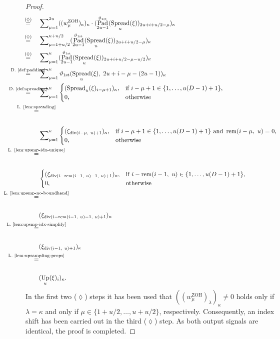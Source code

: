 \documentclass[journal]{IEEEtran}
\newcommand{\discint}[2]{\{#1,\dotsc,#2\}}
\newcommand{\inint}[2]{\in\discint{#1}{#2}}
\renewcommand{\div}[2]{\operatorname{div}(#1,\ #2)}
\newcommand{\rem}[2]{\operatorname{rem}(#1,\ #2)}
\newcommand{\equsing}[1]{\overset{\mathclap{\text{#1}}}{=}}
\DeclareMathOperator{\Upsampling}{Up}
\DeclareMathOperator{\Padding}{Pad}
\DeclareMathOperator{\Spreading}{Spread}
\DeclareMathOperator{\ZOH}{ZOH}
\newcommand{\Dirichlet}{1\text{st}}
\begin{document}
\begin{proof}
\begin{align*}
  \equsing{($\lozenge$)}\ \ \ \ & \sum\nolimits_{\mu = 1}^{2u} ((w^{\ZOH}_\mu)_\kappa)_\kappa \cdot (\Padding_{2u - 1}^{\vartheta_{\Dirichlet}}( \Spreading_u(\xi))_{2u + i + u/2 - \mu})_\kappa\\
  \equsing{($\lozenge$)}\ \ \ \ & \sum\nolimits_{\mu = 1 + u/2}^{u + u/2} (\Padding_{2u - 1}^{\vartheta_{\Dirichlet}}( \Spreading_u(\xi))_{2u + i + u/2 - \mu})_\kappa\\
  \equsing{($\lozenge$)}\ \ \ \ & \sum\nolimits_{\mu = 1}^{u} (\Padding_{2u - 1}^{\vartheta_{\Dirichlet}}( \Spreading_u(\xi))_{2u + i + u/2 - \mu - u/2})_\kappa\\
  \equsing{D.~\ref{def:padding}}\ \ \ \ & \sum\nolimits_{\mu = 1}^{u} \vartheta_{\Dirichlet}( \Spreading_u(\xi),\;2u + i - \mu - (2u - 1))_\kappa\\
  \equsing{D.~\ref{def:spreading}}\ \ \ \ & \sum\nolimits_{\mu = 1}^{u}
      \begin{cases}
        (\Spreading_u(\xi)_{i - \mu + 1})_\kappa\text{,} & \text{if }i - \mu + 1\inint{1}{u(D - 1) + 1}\text{,}\\
        0\text{,} & \text{otherwise}
      \end{cases}\\
  \equsing{L.~\ref{lem:spreading}}\\\\& \sum\nolimits_{\mu = 1}^{u}
      \begin{cases}
        (\xi_{\div{i - \mu}{u} + 1})_\kappa\text{,} & \text{if }i - \mu + 1\inint{1}{u(D - 1) + 1}\text{ and }\rem{i - \mu}{u} = 0\text{,}\\
        0\text{,} & \text{otherwise}
      \end{cases}\\
  \equsing{L.~\ref{lem:upsmp-idx-unique}}\\\\&
      \begin{cases}
        (\xi_{\div{i - \rem{i - 1}{u} - 1}{u} + 1})_\kappa\text{,} & \text{if }i - \rem{i - 1}{u}\inint{1}{u(D - 1) + 1}\text{,}\\
        0\text{,} & \text{otherwise}
      \end{cases}\\
  \equsing{L.~\ref{lem:upsmp-no-boundhand}}\\\\& (\xi_{\div{i - \rem{i - 1}{u} - 1}{u} + 1})_\kappa\\
  \equsing{L.~\ref{lem:upsmp-idx-simplify}}\\\\& (\xi_{\div{i - 1}{u} + 1})_\kappa\\
  \equsing{L.~\ref{lem:upsampling-props}}\\\\& (\Upsampling_u(\xi)_i)_\kappa\text{.}
\end{align*}
In the first two ($\lozenge$) steps it has been used that $((w^{\ZOH}_\mu)_\lambda)_\kappa \neq 0$ holds only if $\lambda = \kappa$ and only if $\mu\inint{1 + u/2}{u + u/2}$, respectively.
Consequently, an index shift has been carried out in the third ($\lozenge$) step.
As both output signals are identical, the proof is completed.
\end{proof}
\end{document}
